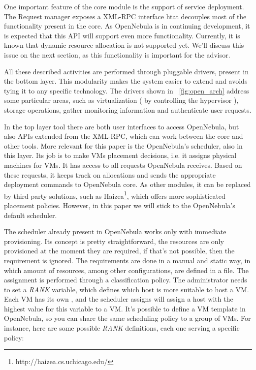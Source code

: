 One important feature of the core module is the support of service deployment. The Request manager exposes a XML-RPC interface htat decouples most of the functionality present in the core. As OpenNebula is in continuing development, it is expected that this API will support even more functionality. Currently, it is known that dynamic resource allocation is not supported yet. We'll discuss this issue on the next section, as this functionality is important for the advisor.

All these described activities are performed through pluggable drivers, present in the bottom layer. This modularity makes the system easier to extend and avoids tying it to any specific technology. The drivers shown in ~\ref{fig:open_arch}  address some particular areas, such as virtualization ( by controlling the hypervisor ), storage operations, gather monitoring information and authenticate user requests.

In the top layer tool there are both user interfaces to access OpenNebula, but also APIs extended from the XML-RPC, which can work between the core and other tools. More relevant for this paper is the OpenNebula's scheduler, also in this layer. Its job is to make VMs placement decisions, i.e. it assigns physical machines for VMs. It has access to all requests OpenNebula receives. Based on these requests, it keeps track on allocations and sends the appropriate deployment commands to OpenNebula core. As other modules, it can be replaced by third party solutions, such as Haizea\footnote{http://haizea.cs.uchicago.edu/},  which offers more sophisticated placement policies. However, in this paper we will stick to the OpenNebula's default scheduler.

The scheduler already present in OpenNebula works only with immediate provisioning. Its concept is pretty straightforward, the resources are only provisioned at the moment they are required, if that's not possible, then the requirement is ignored. The requirements are done in a manual and static way, in which amount of resources, among other configurations, are defined in a file. The assignment is performed through a classification policy.  The administrator needs to set a \textit{RANK} variable, which defines which host is more suitable to host a VM. Each VM has its own , and the scheduler assigns will assign a host with the highest value for this variable to a VM. It's possible to define a VM template in OpenNebula, so you can share the same scheduling policy  to a group of VMs. For instance, here are some possible \textit{RANK} definitions, each one serving a specific policy:

